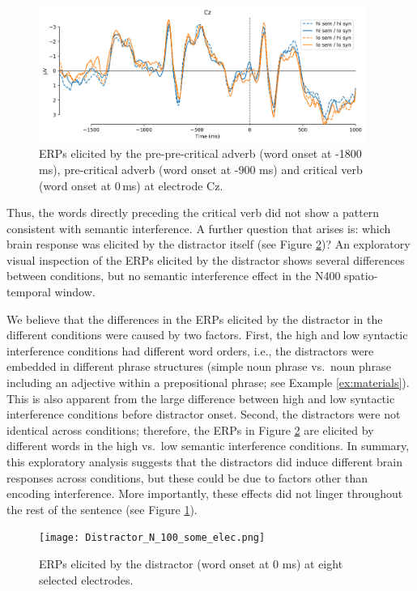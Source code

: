 \documentclass[review,preprint,12pt,authoryear,floatsintext]{elsarticle}
\begin{document}
{\begin{figure}[ht]
    \caption{ERPs elicited by the pre-pre-critical adverb (word onset at -1800 ms), pre-critical adverb (word onset at -900 ms) and critical verb (word onset at 0\,ms) at electrode Cz.}
    \label{fig:erp_precrit}
    \centering
    \includegraphics[width=0.95\textwidth]{N_103_Cz_precrit.png}
\end{figure}

Thus, the words directly preceding the critical verb did not show a pattern consistent with semantic interference. A further question that arises is: which brain response was elicited by the distractor itself (see Figure \ref{fig:erp_distractor})? An exploratory visual inspection of the ERPs elicited by the distractor shows several differences between conditions, but no semantic interference effect in the N400 spatio-temporal window. 

We believe that the differences in the ERPs elicited by the distractor in the different conditions were caused by two factors. First, the high and low syntactic interference conditions had different word orders, i.e., the distractors were embedded in different phrase structures (simple noun phrase vs.\ noun phrase including an adjective within a prepositional phrase; see Example \ref{ex:materials}). This is also apparent from the large difference between high and low syntactic interference conditions before distractor onset. Second, the distractors were not identical across conditions; therefore, the ERPs in Figure \ref{fig:erp_distractor} are elicited by different words in the high vs.\ low semantic interference conditions. In summary, this exploratory analysis suggests that the distractors did induce different brain responses across conditions, but these could be due to factors other than encoding interference. More importantly, these effects did not linger throughout the rest of the sentence (see Figure \ref{fig:erp_precrit}). 

\begin{figure}[ht]
    \centering
        \caption{ERPs elicited by the distractor (word onset at 0 ms) at eight selected electrodes.}
    \label{fig:erp_distractor}\texttt{[image: Distractor\_N\_100\_some\_elec.png]}
\end{figure}

}
\end{document}
